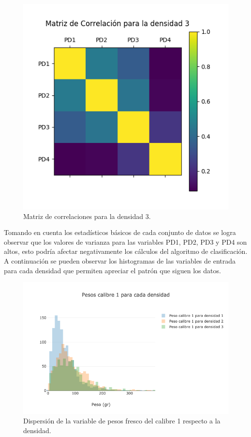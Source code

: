 \begin{figure}[h!]
	\centering
	\includegraphics[scale=0.5]{correlacionD3.jpg}
	\caption{Matriz de correlaciones para la densidad 3.}
	\label{fig:cd3}
\end{figure}

Tomando en cuenta los estadísticos básicos de cada conjunto de datos se logra observar que los valores de varianza para las variables PD1, PD2, PD3 y PD4 son altos, esto podría afectar negativamente los cálculos del algoritmo de clasificación. A continuación se pueden observar los
histogramas de las variables de entrada para cada densidad que permiten apreciar el patrón que siguen los datos.\\

\begin{figure}[h!]
	\centering
	\includegraphics[scale=0.5]{PD1.png}
	\caption{Dispersión de la variable de pesos fresco del calibre 1 respecto a la densidad.}
	\label{fig:pd1}
\end{figure}

